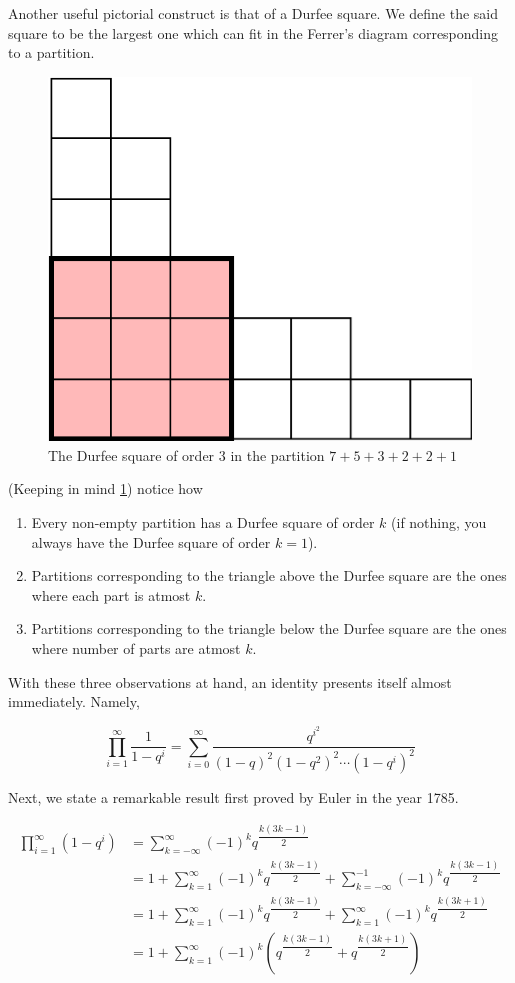Another useful pictorial construct is that of a Durfee square. We define the said square to be the largest one which can fit in the Ferrer’s diagram corresponding to a partition.
\begin{figure}[H]
    \centering
    \includegraphics[width=0.5\linewidth]{Images/Figure19.png}
    \caption{The Durfee square of order $3$ in the partition $7+5+3+2+2+1$}
    \label{DurfeeExample}
\end{figure}
(Keeping in mind \cref{DurfeeExample}) notice how
\begin{enumerate}
    \item Every non-empty partition has a Durfee square of order $k$ (if nothing, you always have the Durfee square of order $k=1$).
    \item Partitions corresponding to the triangle above the Durfee square are the ones where each part is atmost $k$.
    \item Partitions corresponding to the triangle below the Durfee square are the ones where number of parts are atmost $k$. 
\end{enumerate}
With these three observations at hand, an identity presents itself almost immediately. Namely,
\begin{claim}
    \[
    \prod_{i=1}^{\infty}\dfrac{1}{1-q^i} = \sum_{i=0}^{\infty}\dfrac{q^{i^2}}{(1-q)^2(1-q^2)^2\cdots(1-q^i)^2}
    \]
\end{claim}
Next, we state a remarkable result first proved by Euler in the year 1785.
\begin{theorem}
\begin{align*}
\prod_{i=1}^{\infty}(1-q^i) &= \sum_{k=-\infty}^{\infty}(-1)^k q^{\dfrac{k(3k-1)}{2}} \\
&= 1+\sum_{k=1}^{\infty}(-1)^kq^{\dfrac{k(3k-1)}{2}}+\sum_{k=-\infty}^{-1}(-1)^kq^{\dfrac{k(3k-1)}{2}} \\
&= 1+\sum_{k=1}^{\infty}(-1)^kq^{\dfrac{k(3k-1)}{2}}+\sum_{k=1}^{\infty}(-1)^kq^{\dfrac{k(3k+1)}{2}} \\
&= 1+\sum_{k=1}^{\infty}(-1)^k \left(q^{\dfrac{k(3k-1)}{2}}+q^{\dfrac{k(3k+1)}{2}}\right) \\
\end{align*}
\label{t:EPT}
\end{theorem}
